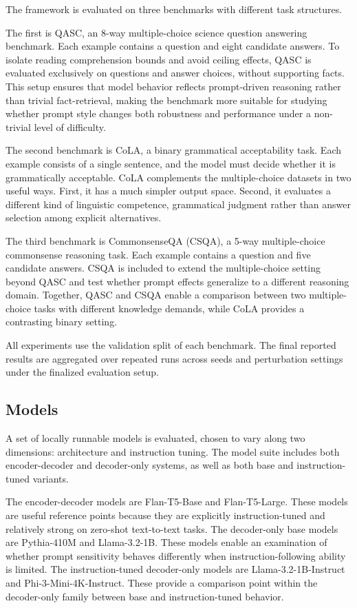 \documentclass[11pt]{article}
\begin{document}
The framework is evaluated on three benchmarks with different task structures.

The first is QASC, an 8-way multiple-choice science question answering benchmark. Each example contains a question and eight candidate answers. To isolate reading comprehension bounds and avoid ceiling effects, QASC is evaluated exclusively on questions and answer choices, without supporting facts. This setup ensures that model behavior reflects prompt-driven reasoning rather than trivial fact-retrieval, making the benchmark more suitable for studying whether prompt style changes both robustness and performance under a non-trivial level of difficulty.

The second benchmark is CoLA, a binary grammatical acceptability task. Each example consists of a single sentence, and the model must decide whether it is grammatically acceptable. CoLA complements the multiple-choice datasets in two useful ways. First, it has a much simpler output space. Second, it evaluates a different kind of linguistic competence, grammatical judgment rather than answer selection among explicit alternatives.

The third benchmark is CommonsenseQA (CSQA), a 5-way multiple-choice commonsense reasoning task. Each example contains a question and five candidate answers. CSQA is included to extend the multiple-choice setting beyond QASC and test whether prompt effects generalize to a different reasoning domain. Together, QASC and CSQA enable a comparison between two multiple-choice tasks with different knowledge demands, while CoLA provides a contrasting binary setting.

All experiments use the validation split of each benchmark. The final reported results are aggregated over repeated runs across seeds and perturbation settings under the finalized evaluation setup.

\subsection{Models}

A set of locally runnable models is evaluated, chosen to vary along two dimensions: architecture and instruction tuning. The model suite includes both encoder-decoder and decoder-only systems, as well as both base and instruction-tuned variants.

The encoder-decoder models are Flan-T5-Base and Flan-T5-Large. These models are useful reference points because they are explicitly instruction-tuned and relatively strong on zero-shot text-to-text tasks. The decoder-only base models are Pythia-410M and Llama-3.2-1B. These models enable an examination of whether prompt sensitivity behaves differently when instruction-following ability is limited. The instruction-tuned decoder-only models are Llama-3.2-1B-Instruct and Phi-3-Mini-4K-Instruct. These provide a comparison point within the decoder-only family between base and instruction-tuned behavior.
\end{document}
